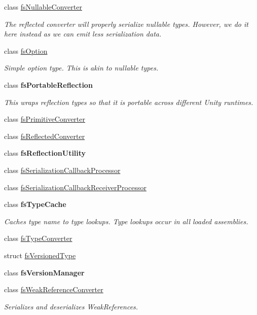 \begin{DoxyCompactItemize}
class \hyperlink{class_full_serializer_1_1_internal_1_1fs_nullable_converter}{fs\+Nullable\+Converter}
\begin{DoxyCompactList}\small\item\em The reflected converter will properly serialize nullable types. However, we do it here instead as we can emit less serialization data. \end{DoxyCompactList}\item 
class \hyperlink{struct_full_serializer_1_1_internal_1_1fs_option}{fs\+Option}
\begin{DoxyCompactList}\small\item\em Simple option type. This is akin to nullable types. \end{DoxyCompactList}\item 
class {\bfseries fs\+Portable\+Reflection}
\begin{DoxyCompactList}\small\item\em This wraps reflection types so that it is portable across different Unity runtimes. \end{DoxyCompactList}\item 
class \hyperlink{class_full_serializer_1_1_internal_1_1fs_primitive_converter}{fs\+Primitive\+Converter}
\item 
class \hyperlink{class_full_serializer_1_1_internal_1_1fs_reflected_converter}{fs\+Reflected\+Converter}
\item 
class {\bfseries fs\+Reflection\+Utility}
\item 
class \hyperlink{class_full_serializer_1_1_internal_1_1fs_serialization_callback_processor}{fs\+Serialization\+Callback\+Processor}
\item 
class \hyperlink{class_full_serializer_1_1_internal_1_1fs_serialization_callback_receiver_processor}{fs\+Serialization\+Callback\+Receiver\+Processor}
\item 
class {\bfseries fs\+Type\+Cache}
\begin{DoxyCompactList}\small\item\em Caches type name to type lookups. Type lookups occur in all loaded assemblies. \end{DoxyCompactList}\item 
class \hyperlink{class_full_serializer_1_1_internal_1_1fs_type_converter}{fs\+Type\+Converter}
\item 
struct \hyperlink{struct_full_serializer_1_1_internal_1_1fs_versioned_type}{fs\+Versioned\+Type}
\item 
class {\bfseries fs\+Version\+Manager}
\item 
class \hyperlink{class_full_serializer_1_1_internal_1_1fs_weak_reference_converter}{fs\+Weak\+Reference\+Converter}
\begin{DoxyCompactList}\small\item\em Serializes and deserializes Weak\+References. \end{DoxyCompactList}\end{DoxyCompactItemize}
